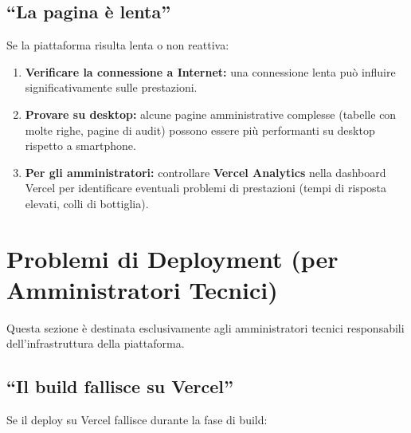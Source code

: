 \documentclass[a4paper,11pt,oneside]{book}
\begin{document}
\subsection{``La pagina \`e lenta''}

Se la piattaforma risulta lenta o non reattiva:

\begin{enumerate}[leftmargin=1.5em]
  \item \textbf{Verificare la connessione a Internet:} una connessione lenta pu\`o influire significativamente sulle prestazioni.
  \item \textbf{Provare su desktop:} alcune pagine amministrative complesse (tabelle con molte righe, pagine di audit) possono essere pi\`u performanti su desktop rispetto a smartphone.
  \item \textbf{Per gli amministratori:} controllare \textbf{Vercel Analytics} nella dashboard Vercel per identificare eventuali problemi di prestazioni (tempi di risposta elevati, colli di bottiglia).
\end{enumerate}

\section{Problemi di Deployment (per Amministratori Tecnici)}
\label{sec:problemi-deployment}

Questa sezione \`e destinata esclusivamente agli amministratori tecnici responsabili dell'infrastruttura della piattaforma.

\subsection{``Il build fallisce su Vercel''}

Se il deploy su Vercel fallisce durante la fase di build:
\end{document}
